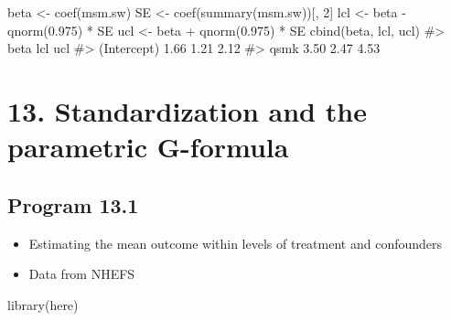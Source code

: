 \documentclass[
  10pt,
  a4paper,
]{book}
\newenvironment{Shaded}{\begin{snugshade}}{\end{snugshade}}
\newcommand{\CommentTok}[1]{\textcolor[rgb]{0.37,0.37,0.37}{#1}}
\newcommand{\DecValTok}[1]{\textcolor[rgb]{0.68,0.00,0.00}{#1}}
\newcommand{\FloatTok}[1]{\textcolor[rgb]{0.68,0.00,0.00}{#1}}
\newcommand{\FunctionTok}[1]{\textcolor[rgb]{0.28,0.35,0.67}{#1}}
\newcommand{\NormalTok}[1]{\textcolor[rgb]{0.00,0.46,0.62}{#1}}
\newcommand{\OtherTok}[1]{\textcolor[rgb]{0.00,0.46,0.62}{#1}}
\newcommand{\SpecialCharTok}[1]{\textcolor[rgb]{0.37,0.37,0.37}{#1}}
\providecommand{\tightlist}{%
  \setlength{\itemsep}{0pt}\setlength{\parskip}{0pt}}
\begin{document}
\begin{Shaded}
\begin{Highlighting}[]
\NormalTok{beta }\OtherTok{\textless{}{-}} \FunctionTok{coef}\NormalTok{(msm.sw)}
\NormalTok{SE }\OtherTok{\textless{}{-}} \FunctionTok{coef}\NormalTok{(}\FunctionTok{summary}\NormalTok{(msm.sw))[, }\DecValTok{2}\NormalTok{]}
\NormalTok{lcl }\OtherTok{\textless{}{-}}\NormalTok{ beta }\SpecialCharTok{{-}} \FunctionTok{qnorm}\NormalTok{(}\FloatTok{0.975}\NormalTok{) }\SpecialCharTok{*}\NormalTok{ SE}
\NormalTok{ucl }\OtherTok{\textless{}{-}}\NormalTok{ beta }\SpecialCharTok{+} \FunctionTok{qnorm}\NormalTok{(}\FloatTok{0.975}\NormalTok{) }\SpecialCharTok{*}\NormalTok{ SE}
\FunctionTok{cbind}\NormalTok{(beta, lcl, ucl)}
\CommentTok{\#\textgreater{}             beta  lcl  ucl}
\CommentTok{\#\textgreater{} (Intercept) 1.66 1.21 2.12}
\CommentTok{\#\textgreater{} qsmk        3.50 2.47 4.53}
\end{Highlighting}
\end{Shaded}

\chapter*{13. Standardization and the parametric G-formula}\label{standardization-and-the-parametric-g-formula}

\section{Program 13.1}\label{program-13.1}

\begin{itemize}
\tightlist
\item
  Estimating the mean outcome within levels of treatment and confounders
\item
  Data from NHEFS
\end{itemize}

\begin{Shaded}
\begin{Highlighting}[]
\FunctionTok{library}\NormalTok{(here)}
\end{Highlighting}
\end{Shaded}
\end{document}
